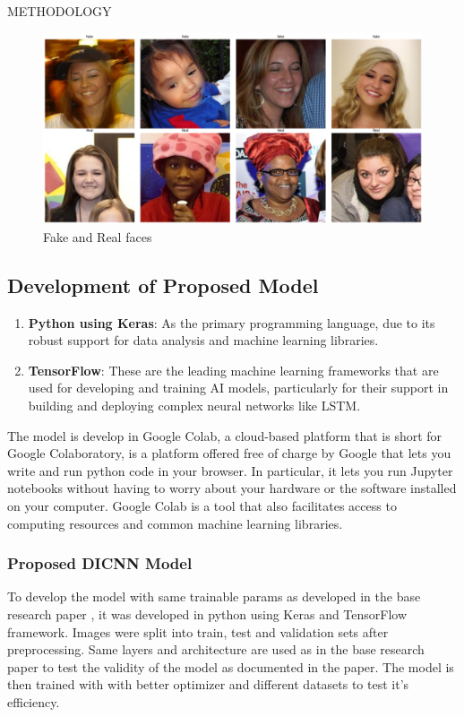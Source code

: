 \begin{section}[]{\uppercase{Methodology}}
  \begin{figure}
    \centering
    \includegraphics[width=\linewidth]{images/datasets.png}
    \caption{Fake and Real faces}
    \label{fig:fake-real-faces}
 \end{figure}
 
 \subsection{Development of Proposed Model}

 \begin{enumerate}
    \item \textbf{Python using Keras}: As the primary programming language, due to its robust support for data analysis and machine learning libraries.
    \item \textbf{TensorFlow}: These are the leading machine learning frameworks that are used for developing and training AI models, particularly for their support in building and deploying complex neural networks like LSTM.
\end{enumerate}

The model is develop in Google Colab, a cloud-based platform that is short for Google Colaboratory, is a platform offered free of charge by Google that lets you write and run python code in your browser. In particular, it lets you run Jupyter notebooks without having to worry about your hardware or the software installed on your computer. \cite{DataScientest2021}
Google Colab is a tool that also facilitates access to computing resources and common machine learning libraries. 

 \subsubsection{Proposed DICNN Model}
To develop the model with same trainable params as developed in the base research paper \cite{Bhandari2023}, it was developed in python using Keras and TensorFlow framework. Images were split into train, test and validation sets after preprocessing. Same layers and architecture are used as in the base research paper to test the validity of the model as documented in the paper. The model is then trained with with better optimizer and different datasets to test it's efficiency.


\end{section}
